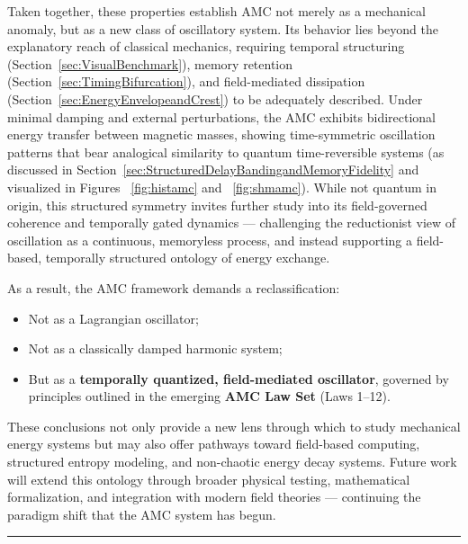 \documentclass[10pt,aps,pre,onecolumn,superscriptaddress,notitlepage]{revtex4-2}
\begin{document}
Taken together, these properties establish AMC not merely as a mechanical anomaly, but as a new class of oscillatory system. Its behavior lies beyond the explanatory reach of classical mechanics, requiring temporal structuring (Section~\ref{sec:VisualBenchmark}), memory retention (Section~\ref{sec:TimingBifurcation}), and field-mediated dissipation (Section~\ref{sec:EnergyEnvelopeandCrest}) to be adequately described. Under minimal damping and external perturbations, the AMC exhibits bidirectional energy transfer between magnetic masses, showing time-symmetric oscillation patterns that bear analogical similarity to quantum time-reversible systems (as discussed in Section~\ref{sec:StructuredDelayBandingandMemoryFidelity} and visualized in Figures ~\ref{fig:histamc} and ~\ref{fig:shmamc}). While not quantum in origin, this structured symmetry invites further study into its field-governed coherence and temporally gated dynamics — challenging the reductionist view of oscillation as a continuous, memoryless process, and instead supporting a field-based, temporally structured ontology of energy exchange.

As a result, the AMC framework demands a reclassification:
\begin{itemize}
    \item Not as a Lagrangian oscillator;
    \item Not as a classically damped harmonic system;
    \item But as a \textbf{temporally quantized, field-mediated oscillator}, governed by principles outlined in the emerging \textbf{AMC Law Set} (Laws 1–12).
\end{itemize}
These conclusions not only provide a new lens through which to study mechanical energy systems but may also offer pathways toward field-based computing, structured entropy modeling, and non-chaotic energy decay systems. 
Future work will extend this ontology through broader physical testing, mathematical formalization, and integration with modern field theories — continuing the paradigm shift that the AMC system has begun.  
\vspace{1em}
\hrule
\vspace{1em}
\end{document}
